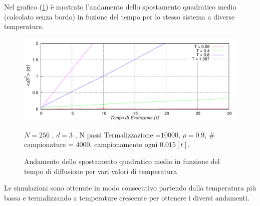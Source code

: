 Nel grafico (\ref{fig: Problema11}) è mostrato l'andamento dello spostamento quadratico medio (calcolato senza bordo) in fuzione del tempo per lo stesso sistema a diverse temperature.
	\begin{figure}[htbp]
		\centering
		\caption[Sfere Soffici$/$Problema11.cpp]{Andamento dello spostamento quadratico medio in funzione del tempo di diffusione per vari valori di temperatura}\label{fig: Problema11}\vspace{-15pt}

		\includegraphics[scale=0.95]{Immagini/Soffici/dS_quadvsDt}

		\centering  \footnotesize{$N= 256$ , $d=3$ , N passi Termalizzazione =$ 10000$, $\rho = 0.9$, $\#$ campionature = $ 4000$, campionamento ogni $0.015 [t]$.}
	\end{figure}
Le simulazioni sono ottenute in modo consecutivo partendo dalla temperatura più bassa e termalizzando a temperature crescente per ottenere i diversi andamenti.


